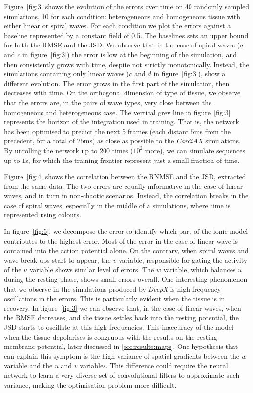 \documentclass[utf8]{frontiersSCNS} %
\begin{document}
Figure~\ref{fig:3} shows the evolution of the errors over time on 40 randomly sampled simulations, 10 for each condition: heterogeneous and homogeneous tissue with either linear or spiral waves. For each condition we plot the errors against a baseline represented by a constant field of 0.5. The baselines sets an upper bound for both the RMSE and the JSD.
We observe that in the case of spiral waves ($a$ and $c$ in figure~\ref{fig:3}) the error is low at the beginning of the simulation, and then consistently grows with time, despite not strictly monotonically.
Instead, the simulations containing only linear waves ($c$ and $d$ in figure~\ref{fig:3}), show a different evolution. The error grows in the first part of the simulation, then decreases with time. 
On the orthogonal dimension of type of tissue, we observe that the errors are, in the pairs of wave types, very close between the homogeneous and heterogeneous case.
The vertical grey line in figure~\ref{fig:3} represents the horizon of the integration used in training. That is, the network has been optimised to predict the next 5 frames (each distant $5$ms from the precedent, for a total of $25$ms) as close as possible to the \textit{CardiAX} simulations. 
By unrolling the network up to $200$ times ($10^2$ more), we can simulate sequences up to $1$s, for which the training frontier represent just a small fraction of time.

Figure~\ref{fig:4} shows the correlation between the RNMSE and the JSD, extracted from the same data. The two errors are equally informative in the case of linear waves, and in turn in non-chaotic scenarios.
Instead, the correlation breaks in the case of spiral waves, especially in the middle of a simulations, where time is represented using colours.

In figure~\ref{fig:5}, we decompose the error to identify which part of the ionic model contributes to the highest error.
Most of the error in the case of linear wave is contained into the action potential alone. On the contrary, when spiral waves and wave break-ups start to appear, the $v$ variable, responsible for gating the activity of the $u$ variable shows similar level of errors. 
The $w$ variable, which balances $u$ during the resting phase, shows small errors overall.
% 
One interesting phenomenon that we observe in the simulations produced by \textit{DeepX} is high frequency oscillations in the errors.
This is particularly evident when the tissue is in recovery. In figure~\ref{fig:3} we can observe that, in the case of linear waves, when the RMSE decreases, and the tissue settles back into the resting potential, the JSD starts to oscillate at this high frequencies.
This inaccuracy of the model when the tissue depolarises is congruous with the results on the resting membrane potential, later discussed in \ref{sec:results:maps}.
One hypothesis that can explain this symptom is the high variance of spatial gradients between the $w$ variable and the $u$ and $v$ variables. This difference could require the neural network to learn a very diverse set of convolutional filters to approximate such variance, making the optimisation problem more difficult.
\end{document}
